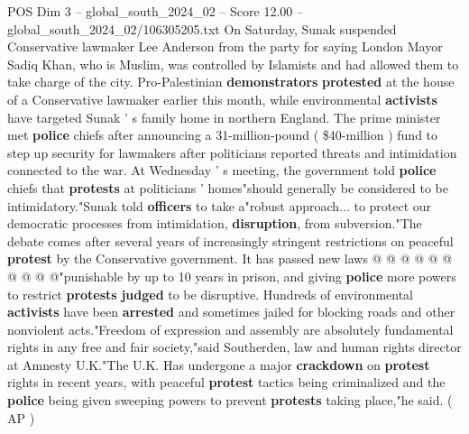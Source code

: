 \begin{textsample}{POS Dim 3 – global\_south\_2024\_02 – Score 12.00 – global\_south\_2024\_02/106305205.txt}
On Saturday, Sunak suspended Conservative lawmaker Lee Anderson from the party for saying London Mayor Sadiq Khan, who is Muslim, was controlled by Islamists and had allowed them to take charge of the city.
Pro-Palestinian \textbf{demonstrators} \textbf{protested} at the house of a Conservative lawmaker earlier this month, while environmental \textbf{activists} have targeted Sunak ' s family home in northern England.
The prime minister met \textbf{police} chiefs after announcing a 31-million-pound ( \$40-million ) fund to step up security for lawmakers after politicians reported threats and intimidation connected to the war.
At Wednesday ' s meeting, the government told \textbf{police} chiefs that \textbf{protests} at politicians ' homes"should generally be considered to be intimidatory."Sunak told \textbf{officers} to take a"robust approach... to protect our democratic processes from intimidation, \textbf{disruption}, from subversion."The debate comes after several years of increasingly stringent restrictions on peaceful \textbf{protest} by the Conservative government.
It has passed new laws @ @ @ @ @ @ @ @ @ @"punishable by up to 10 years in prison, and giving \textbf{police} more powers to restrict \textbf{protests} \textbf{judged} to be disruptive.
Hundreds of environmental \textbf{activists} have been \textbf{arrested} and sometimes jailed for blocking roads and other nonviolent acts."Freedom of expression and assembly are absolutely fundamental rights in any free and fair society,"said Southerden, law and human rights director at Amnesty U.K."The U.K.
Has undergone a major \textbf{crackdown} on \textbf{protest} rights in recent years, with peaceful \textbf{protest} tactics being criminalized and the \textbf{police} being given sweeping powers to prevent \textbf{protests} taking place,"he said. ( AP )

\end{textsample}
